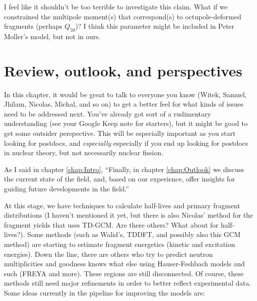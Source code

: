 I feel like it shouldn't be too terrible to investigate this claim. What if we constrained the multipole moment(s) that correspond(s) to octupole-deformed fragments (perhaps $Q_{50}$)? I think this parameter might be included in Peter Moller's model, but not in ours.

\section{Review, outlook, and perspectives}

In this chapter, it would be great to talk to everyone you know (Witek, Samuel, Jhilam, Nicolas, Michal, and so on) to get a better feel for what kinds of issues need to be addressed next. You've already got sort of a rudimentary understanding (see your Google Keep note for starters), but it might be good to get some outsider perspective. This will be especially important as you start looking for postdocs, and \textit{especially} especially if you end up looking for postdocs in nuclear theory, but not necessarily nuclear fission.

As I said in chapter \ref{chap:Intro}, ``Finally, in chapter \ref{chap:Outlook} we discuss the current state of the field, and, based on our experience, offer insights for guiding future developments in the field.''

At this stage, we have techniques to calculate half-lives and primary fragment distributions (I haven't mentioned it yet, but there is also Nicolas' method for the fragment yields that uses TD-GCM. Are there others? What about for half-lives?). Some methods (such as Walid's, TDDFT, and possibly also this GCM method) are starting to estimate fragment energetics (kinetic and excitation energies). Down the line, there are others who try to predict neutron multiplicities and goodness knows what else using Hauser-Feshbach models and such (FREYA and more). These regions are still disconnected. Of course, these methods still need major refinements in order to better reflect experimental data. Some ideas currently in the pipeline for improving the models are:

